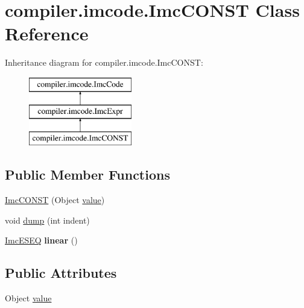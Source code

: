 \hypertarget{classcompiler_1_1imcode_1_1_imc_c_o_n_s_t}{}\section{compiler.\+imcode.\+Imc\+C\+O\+N\+ST Class Reference}
\label{classcompiler_1_1imcode_1_1_imc_c_o_n_s_t}
Inheritance diagram for compiler.\+imcode.\+Imc\+C\+O\+N\+ST\+:\begin{figure}[H]
\begin{center}
\leavevmode
\includegraphics[height=3.000000cm]{classcompiler_1_1imcode_1_1_imc_c_o_n_s_t}
\end{center}
\end{figure}
\subsection*{Public Member Functions}
\begin{DoxyCompactItemize}
\item 
\hyperlink{classcompiler_1_1imcode_1_1_imc_c_o_n_s_t_aafeb0eaeec69bd90ac8daf20bcc888b4}{Imc\+C\+O\+N\+ST} (Object \hyperlink{classcompiler_1_1imcode_1_1_imc_c_o_n_s_t_a9857b77242e0f1f89bd1e1d0251832bf}{value})
\item 
void \hyperlink{classcompiler_1_1imcode_1_1_imc_c_o_n_s_t_a8b39fe0c0fc23dd55e8a1b0d61a7c97d}{dump} (int indent)
\item 
\mbox{\label{classcompiler_1_1imcode_1_1_imc_c_o_n_s_t_a5df59115c8b0eb1a8ddee1a7a69cc686}} 
\hyperlink{classcompiler_1_1imcode_1_1_imc_e_s_e_q}{Imc\+E\+S\+EQ} {\bfseries linear} ()
\end{DoxyCompactItemize}
\subsection*{Public Attributes}
\begin{DoxyCompactItemize}
\item 
Object \hyperlink{classcompiler_1_1imcode_1_1_imc_c_o_n_s_t_a9857b77242e0f1f89bd1e1d0251832bf}{value}
\end{DoxyCompactItemize}



